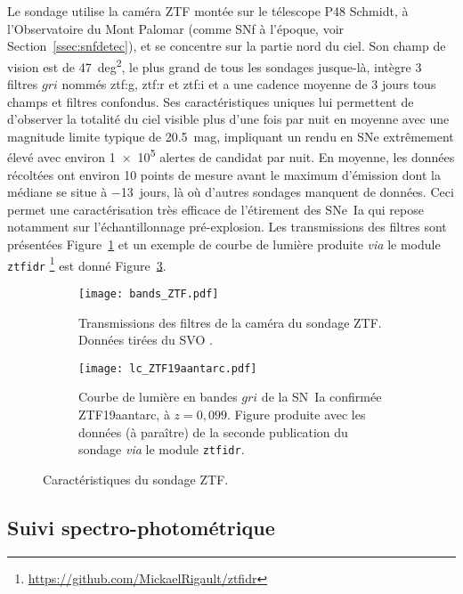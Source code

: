 \documentclass[../main/main.tex]{subfiles}
\begin{document}
Le sondage utilise la caméra ZTF montée sur le télescope P48 Schmidt, à
l'Observatoire du Mont Palomar (comme SNf à l'époque, voir
Section~\ref{ssec:snfdetec}), et se concentre sur la partie nord du ciel. Son
champ de vision est de \SI{47}{deg^2}, le plus grand de tous les sondages
jusque-là, intègre 3 filtres $gri$ nommés ztf:g, ztf:r et ztf:i et a une cadence
moyenne de 3 jours tous champs et filtres confondus. Ses caractéristiques
uniques lui permettent de d'observer la totalité du ciel visible plus d'une fois
par nuit en moyenne avec une magnitude limite typique de \SI{20.5}{mag},
impliquant un rendu en SNe extrêmement élevé avec environ \num{1e5} alertes de
candidat par nuit. En moyenne, les données récoltées ont environ 10 points de
mesure avant le maximum d'émission dont la médiane se situe à \SI{-13}{jours},
là où d'autres sondages manquent de données. Ceci permet une caractérisation
très efficace de l'étirement des SNe~Ia qui repose notamment sur
l'échantillonnage pré-explosion. Les transmissions des filtres sont présentées
Figure~\ref{fig:ztfbands} et un exemple de courbe de lumière produite
\textit{via} le module \texttt{ztfidr}
\footnote{\label{fn:ztfidr}\href{https://github.com/MickaelRigault/ztfidr}
{https://github.com/MickaelRigault/ztfidr}} est donné Figure~\ref{fig:ztflc}. 

\begin{figure}[ht]
    \centering
    \begin{subfigure}[]{.49\linewidth}
        \centering
        \texttt{[image: bands\_ZTF.pdf]}
        \caption[Transmissions des filtres de la caméra du sondage ZTF]
        {Transmissions des filtres de la caméra du sondage ZTF. Données tirées
        du SVO \citep{rodrigo2020}.}
        \label{fig:ztfbands}
    \end{subfigure}
    \begin{subfigure}[]{.49\linewidth}
        \centering
        \texttt{[image: lc\_ZTF19aantarc.pdf]}
        \caption[Courbe de lumière de la SN ZTF19aantarc]{Courbe de lumière en
            bandes $gri$ de la SN~Ia confirmée ZTF19aantarc, à $z = 0,099$.
            Figure produite avec les données (à paraître) de la seconde
            publication du sondage \textit{via} le module
        \texttt{ztfidr}.}
        \label{fig:ztflc}
    \end{subfigure}
    \caption{Caractéristiques du sondage ZTF.}
\end{figure}

\subsection{Suivi spectro-photométrique}\label{ssec:ztfspectro}
\end{document}
